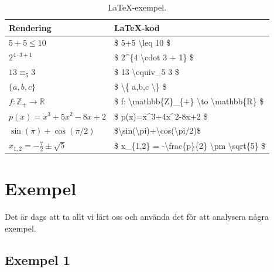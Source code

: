 \documentclass[titlepage]{article}
\begin{document}
\begin{table}[H]
    \begin{center}
        \begin{tabular}{| l | l |}
            \hline
            \textbf{Rendering} & \textbf{\LaTeX-kod} \\
            \hline
            $5+5 \leq 10$ & \$ 5+5 \textbackslash leq 10 \$ \\
            \hline
            $2^{4\cdot3 + 1}$ & \$ 2\textasciicircum \{4 \textbackslash cdot 3 + 1\} \$ \\
            \hline
            $13 \equiv_5 3$ & \$ 13 \textbackslash equiv\_5 3 \$ \\
            \hline
            $\{a,b,c\}$ & \$ \textbackslash\{ a,b,c \textbackslash\} \$ \\
            \hline
            $f:\mathbb{Z}_{+} \to \mathbb{R}$ & \$ f: \textbackslash mathbb\{Z\}\_\{+\} \textbackslash to \textbackslash mathbb\{R\} \$ \\
            \hline
            $p(x)=x^3+5x^2-8x+2$ & \$ p(x)=x\textasciicircum 3+4x\textasciicircum 2-8x+2 \$ \\
            \hline
            $\sin(\pi)+\cos(\pi/2)$ & \$\textbackslash sin(\textbackslash pi)+\textbackslash cos(\textbackslash pi/2)\$ \\
            \hline
            $x_{1,2} = -\frac{7}{2} \pm \sqrt{5}$ & \$ x\_\{1,2\} = -\textbackslash frac\{p\}\{2\} \textbackslash pm \textbackslash sqrt\{5\} \$ \\
            \hline
        \end{tabular}
        \caption{\LaTeX-exempel.}
        \label{t3}
    \end{center}
\end{table}




\section{Exempel}

Det är dags att ta allt vi lärt oss och använda det för att analysera några exempel.



\subsection*{Exempel 1}
\end{document}
